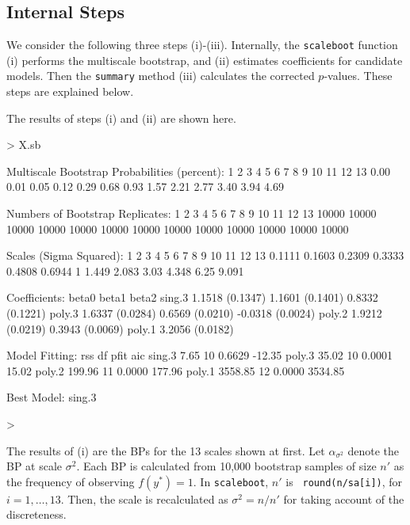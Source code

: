 \documentclass[a4paper]{amsart}
\begin{document}
\subsection{Internal Steps}

We consider the following three steps (i)-(iii).
Internally, the {\tt scaleboot} function (i) performs the multiscale
bootstrap, and (ii) estimates coefficients for candidate models. Then
the {\tt summary} method (iii) calculates the corrected $p$-values.
These steps are explained below.

The results of steps (i) and (ii) are shown here.
\begin{Schunk}
\begin{Sinput}
> X.sb
\end{Sinput}
\begin{Soutput}
Multiscale Bootstrap Probabilities (percent):
1    2    3    4    5    6    7    8    9    10   11   12   13   
0.00 0.01 0.05 0.12 0.29 0.68 0.93 1.57 2.21 2.77 3.40 3.94 4.69 

Numbers of Bootstrap Replicates:
1     2     3     4     5     6     7     8     9     10    11    12    13    
10000 10000 10000 10000 10000 10000 10000 10000 10000 10000 10000 10000 10000 

Scales (Sigma Squared):
1      2      3      4      5      6      7 8     9     10   11    12   13    
0.1111 0.1603 0.2309 0.3333 0.4808 0.6944 1 1.449 2.083 3.03 4.348 6.25 9.091 

Coefficients:
       beta0           beta1           beta2            
sing.3 1.1518 (0.1347) 1.1601 (0.1401)  0.8332 (0.1221) 
poly.3 1.6337 (0.0284) 0.6569 (0.0210) -0.0318 (0.0024) 
poly.2 1.9212 (0.0219) 0.3943 (0.0069)                  
poly.1 3.2056 (0.0182)                                  

Model Fitting:
       rss     df pfit   aic     
sing.3    7.65 10 0.6629  -12.35 
poly.3   35.02 10 0.0001   15.02 
poly.2  199.96 11 0.0000  177.96 
poly.1 3558.85 12 0.0000 3534.85 

Best Model:  sing.3 
\end{Soutput}
\begin{Sinput}
> 
\end{Sinput}
\end{Schunk}

The results of (i) are the BPs for the 13 scales shown at first. Let
$\alpha_{\sigma^2}$ denote the BP at scale $\sigma^2$. Each BP is
calculated from 10,000 bootstrap samples of size $n'$ as the frequency
of observing $f(y^*)=1$. In {\tt scaleboot}, $n'$ is {\tt
round(n/sa[i])}, for $i=1,\ldots,13$. Then, the scale is recalculated
as $\sigma^2=n/n'$ for taking account of the discreteness. 
\end{document}
